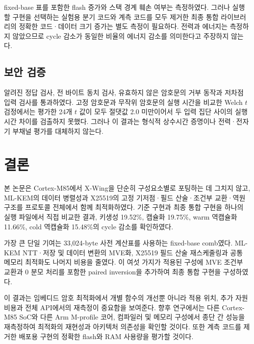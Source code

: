 \documentclass[runningheads,orivec]{llncs}
\newcommand{\xwing}{X-Wing}
\begin{document}
fixed-base 표를 포함한 flash 증가와 스택 경계 훼손 여부는 측정하였다. 그러나 실행할
구현을 선택하는 실험용 분기 코드와 계측 코드를 모두 제거한 최종 통합 라이브러리의
정확한 코드·데이터 크기 증가는 별도 측정이 필요하다. 전력과 에너지는 측정하지
않았으므로 cycle 감소가 동일한 비율의 에너지 감소를 의미한다고 주장하지 않는다.

\subsection{보안 검증}

알려진 정답 검사, 전 바이트 동치 검사, 유효하지 않은 암호문의 거부 동작과 저차점
입력 검사를 통과하였다. 고정 암호문과 무작위 암호문의 실행 시간을 비교한 Welch
$t$ 검정에서는 평가한 24개 $t$ 값이 모두 절댓값 2.0 미만이어서 두 입력 집단 사이의
실행 시간 차이를 검출하지 못했다. 그러나 이 결과는 형식적 상수시간 증명이나
전력·전자기 부채널 평가를 대체하지 않는다.

\section{결론}\label{sec:conclusion}

본 논문은 Cortex-M85에서 \xwing{}을 단순히 구성요소별로 포팅하는 데 그치지 않고,
ML-KEM의 데이터 병렬성과 X25519의 고정 기저점·필드 산술·조건부 교환·역원 구조를
프로토콜 전체에서 함께 최적화하였다. 기준 구현과 최종 통합 구현을 하나의 실행
파일에서 직접 비교한 결과, 키생성 19.52\%, 캡슐화 19.75\%, warm 역캡슐화
11.66\%, cold 역캡슐화 15.48\%의 cycle 감소를 확인하였다.

가장 큰 단일 기여는 33,024-byte 사전 계산표를 사용하는 fixed-base comb였다.
ML-KEM NTT·저장 및 데이터 변환의 MVE화, X25519 필드 산술 재스케줄링과 공통
메모리 최적화도 나머지 비용을 줄였다. 이 여섯 가지가 적용된 구성에 MVE 조건부
교환과 0 분모 처리를 포함한 paired inversion을 추가하여 최종 통합 구현을 구성하였다.

이 결과는 임베디드 암호 최적화에서 개별 함수의 개선뿐 아니라 적용 위치, 추가 자원
비용과 전체 API에서의 재측정이 중요함을 보여준다. 향후 연구에서는 다른 Cortex-M85
SoC와 다른 Arm M-profile 코어, 컴파일러 및 메모리 구성에서 종단 간 성능을 재측정하여
최적화의 재현성과 아키텍처 의존성을 확인할 것이다. 또한 계측 코드를 제거한 배포용
구현의 정확한 flash와 RAM 사용량을 평가할 것이다.



\end{document}
